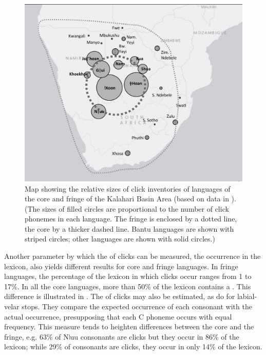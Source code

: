 \documentclass[output=paper,newtxmath,modfonts,nonflat,draftmode]{langsci/langscibook}
\begin{document}
\begin{figure}
\includegraphics[height=.35\textheight]{figures/sands-fig1.png}
\caption{Map showing the relative sizes of click inventories of languages of the core and fringe of the Kalahari Basin Area (based on data in ). (The sizes of filled circles are proportional to the number of click phonemes in each language. The fringe is enclosed by a dotted line, the core by a thicker dashed line. Bantu languages are shown with striped circles; other languages are shown with solid circles.)} 
\label{fig:sands:1}
\end{figure}

Another parameter by which the  of clicks can be measured, the occurrence in the lexicon, also yields different results for core and fringe languages. In  fringe languages, the percentage of the lexicon in which clicks occur ranges from 1 to 17\%. In all the core languages, more than 50\% of the lexicon contains a . This difference is illustrated in . The  of clicks may also be estimated, as \citet{idiatov2016} do for labial-velar stops. They compare the expected occurrence of each consonant with the actual occurrence, presupposing that each C phoneme occurs with equal frequency. This measure tends to heighten differences between the core and the fringe, e.g. 63\% of Nǀuu consonants are clicks but they occur in 86\% of the lexicon; while 29\% of  consonants are clicks, they occur in only 14\% of the lexicon. 
\end{document}
